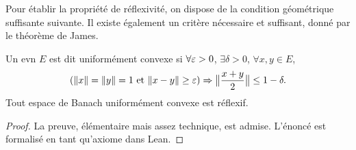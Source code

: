 Pour établir la propriété de réflexivité, on dispose de la condition géométrique suffisante suivante.
Il existe également un critère nécessaire et suffisant, donné par le théorème de James. 
%
%


\begin{theorem}
\label{th:unifCvxReflex}
%
	Un evn $E$ est dit uniformément convexe si $\forall \varepsilon>0$, $\exists \delta>0$, $\forall x,y \in E$,
	\begin{align}
	\label{eq:unif_cvx_ball}
		(\|x\|=\|y\|=1 \text{ et } \|x-y\| \geq \varepsilon) \Rightarrow \big\|\frac{x+y} 2\big\| \leq 1-\delta.
	\end{align}
	Tout espace de Banach uniformément convexe est réflexif. 
\end{theorem}

\begin{proof}
	La preuve, élémentaire mais assez technique, est admise. 
	L'énoncé est formalisé en tant qu'axiome dans Lean.
\end{proof}

